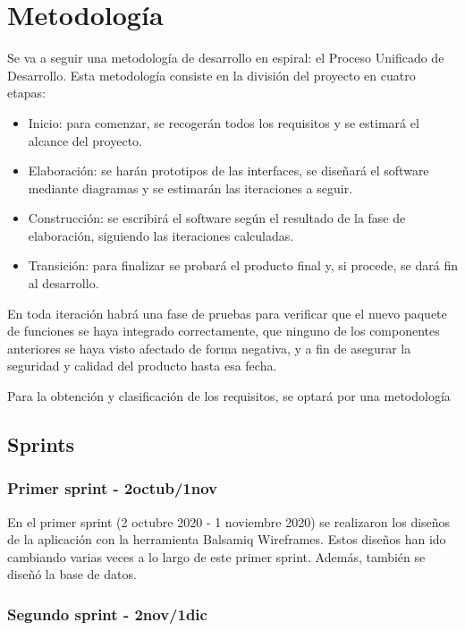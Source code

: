 \chapter{Metodología}
\label{cap:MiMetodologia}


Se va a seguir una metodología de desarrollo en espiral: el Proceso Unificado de Desarrollo. Esta metodología consiste en la división del proyecto en cuatro etapas:
\begin{itemize}
    \item Inicio: para comenzar, se recogerán todos los requisitos y se estimará el alcance del proyecto.
    \item Elaboración: se harán prototipos de las interfaces, se diseñará el software mediante diagramas y se estimarán las iteraciones a seguir.
    \item Construcción: se escribirá el software según el resultado de la fase de elaboración, siguiendo las iteraciones calculadas. 
    \item Transición: para finalizar se probará el producto final y, si procede, se dará fin al desarrollo.
\end{itemize}
En toda iteración habrá una fase de pruebas para verificar que el nuevo paquete de funciones se haya integrado correctamente, que ninguno de los componentes anteriores se haya visto afectado de forma negativa, y a fin de asegurar la seguridad y calidad del producto hasta esa fecha.

Para la obtención y clasificación de los requisitos, se optará por una metodología 

\section{Sprints}


\subsection{Primer sprint - 2octub/1nov}

En el primer sprint (2 octubre 2020 - 1 noviembre 2020) se realizaron los diseños de la aplicación con la herramienta Balsamiq Wireframes. Estos diseños han ido cambiando varias veces a lo largo de este primer sprint. Además, también se diseñó la base de datos.

\subsection{Segundo sprint - 2nov/1dic}

